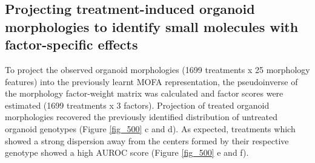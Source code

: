 \begin{flushleft}
\newpage
\section{Projecting treatment-induced organoid morphologies to identify small molecules with factor-specific effects}







To project the observed organoid morphologies (1699 treatments x 25 morphology features) into the previously learnt MOFA representation, the pseudoinverse of the morphology factor-weight matrix was calculated and factor scores were estimated (1699 treatments x 3 factors). Projection of treated organoid morphologies recovered the previously identified distribution of untreated organoid genotypes (Figure \ref{fig_500} c and d). As expected, treatments which showed a strong dispersion away from the centers formed by their respective genotype showed a high AUROC score (Figure \ref{fig_500} e and f).
\bigbreak


\end{flushleft}

